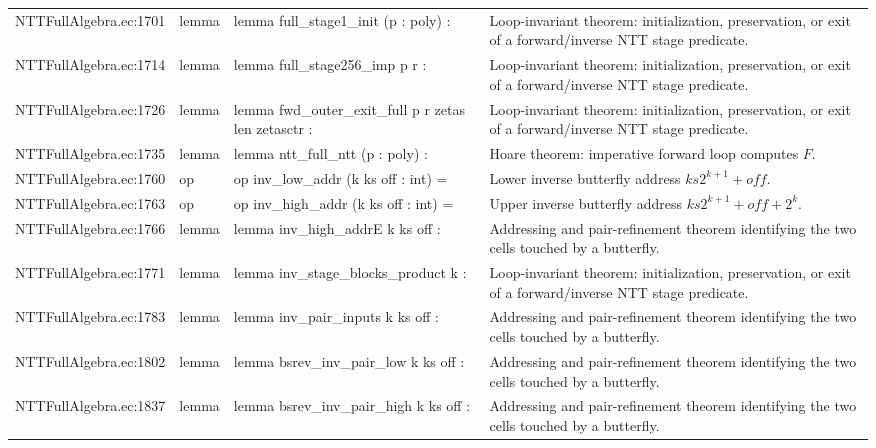 \documentclass[10pt]{article}
\begin{document}
\begin{longtable}{L{0.11\textwidth}L{0.05\textwidth}L{0.38\textwidth}L{0.42\textwidth}}
NTTFullAlgebra.\allowbreak{}ec:\allowbreak{}1701 & lemma & {\ttfamily\scriptsize lemma full\_stage1\_init (p : poly) :} & Loop-invariant theorem: initialization, preservation, or exit of a forward/inverse NTT stage predicate. \\
NTTFullAlgebra.\allowbreak{}ec:\allowbreak{}1714 & lemma & {\ttfamily\scriptsize lemma full\_stage256\_imp p r :} & Loop-invariant theorem: initialization, preservation, or exit of a forward/inverse NTT stage predicate. \\
NTTFullAlgebra.\allowbreak{}ec:\allowbreak{}1726 & lemma & {\ttfamily\scriptsize lemma fwd\_outer\_exit\_full p r zetas len zetasctr :} & Loop-invariant theorem: initialization, preservation, or exit of a forward/inverse NTT stage predicate. \\
NTTFullAlgebra.\allowbreak{}ec:\allowbreak{}1735 & lemma & {\ttfamily\scriptsize lemma ntt\_full\_ntt (p : poly) :} & Hoare theorem: imperative forward loop computes $F$. \\
NTTFullAlgebra.\allowbreak{}ec:\allowbreak{}1760 & op & {\ttfamily\scriptsize op inv\_low\_addr (k ks off : int) =} & Lower inverse butterfly address $ks2^{k+1}+off$. \\
NTTFullAlgebra.\allowbreak{}ec:\allowbreak{}1763 & op & {\ttfamily\scriptsize op inv\_high\_addr (k ks off : int) =} & Upper inverse butterfly address $ks2^{k+1}+off+2^k$. \\
NTTFullAlgebra.\allowbreak{}ec:\allowbreak{}1766 & lemma & {\ttfamily\scriptsize lemma inv\_high\_addrE k ks off :} & Addressing and pair-refinement theorem identifying the two cells touched by a butterfly. \\
NTTFullAlgebra.\allowbreak{}ec:\allowbreak{}1771 & lemma & {\ttfamily\scriptsize lemma inv\_stage\_blocks\_product k :} & Loop-invariant theorem: initialization, preservation, or exit of a forward/inverse NTT stage predicate. \\
NTTFullAlgebra.\allowbreak{}ec:\allowbreak{}1783 & lemma & {\ttfamily\scriptsize lemma inv\_pair\_inputs k ks off :} & Addressing and pair-refinement theorem identifying the two cells touched by a butterfly. \\
NTTFullAlgebra.\allowbreak{}ec:\allowbreak{}1802 & lemma & {\ttfamily\scriptsize lemma bsrev\_inv\_pair\_low k ks off :} & Addressing and pair-refinement theorem identifying the two cells touched by a butterfly. \\
NTTFullAlgebra.\allowbreak{}ec:\allowbreak{}1837 & lemma & {\ttfamily\scriptsize lemma bsrev\_inv\_pair\_high k ks off :} & Addressing and pair-refinement theorem identifying the two cells touched by a butterfly. \\

\end{longtable}
\end{document}
